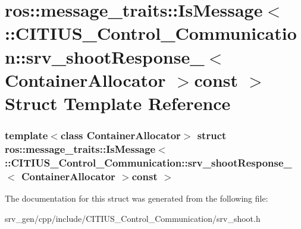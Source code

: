 \hypertarget{structros_1_1message__traits_1_1_is_message_3_01_1_1_c_i_t_i_u_s___control___communication_1_1sr30d661cbd7da966578783c2d0b29f9bc}{\section{ros\-:\-:message\-\_\-traits\-:\-:\-Is\-Message$<$ \-:\-:\-C\-I\-T\-I\-U\-S\-\_\-\-Control\-\_\-\-Communication\-:\-:srv\-\_\-shoot\-Response\-\_\-$<$ \-Container\-Allocator $>$const $>$ \-Struct \-Template \-Reference}
\label{structros_1_1message__traits_1_1_is_message_3_01_1_1_c_i_t_i_u_s___control___communication_1_1sr30d661cbd7da966578783c2d0b29f9bc}
}
\subsubsection*{template$<$class Container\-Allocator$>$ struct ros\-::message\-\_\-traits\-::\-Is\-Message$<$ \-::\-C\-I\-T\-I\-U\-S\-\_\-\-Control\-\_\-\-Communication\-::srv\-\_\-shoot\-Response\-\_\-$<$ Container\-Allocator $>$const  $>$}



\-The documentation for this struct was generated from the following file\-:\begin{DoxyCompactItemize}
\item 
srv\-\_\-gen/cpp/include/\-C\-I\-T\-I\-U\-S\-\_\-\-Control\-\_\-\-Communication/srv\-\_\-shoot.\-h\end{DoxyCompactItemize}
